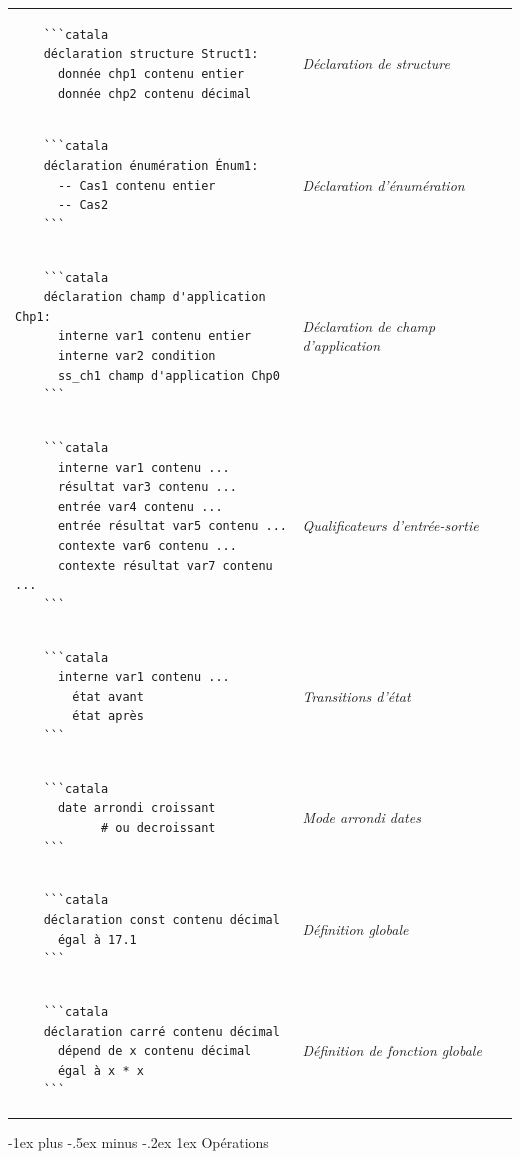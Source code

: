 \documentclass{article}
\makeatletter
\newcommand\articlenormalsize{\fontsize{10pt}{12pt}\selectfont}
\renewcommand{\section}{\@startsection{section}{1}{0mm}%
                                {-1ex plus -.5ex minus -.2ex}%
                                {1ex}%
                                {\normalfont\articlenormalsize\bfseries}}
\newenvironment{catala}{%
  \VerbatimEnvironment
  \let\FV@ListVSpace\relax
  \begin{verbatim}}%
 {\end{verbatim}}
\makeatother
\begin{document}
\begin{multicols}{3}
\begin{tabular}{@{}p{\cola}>{\slshape}p{\colb}@{}}
  
  \begin{catala}
    ```catala
    déclaration structure Struct1:
      donnée chp1 contenu entier
      donnée chp2 contenu décimal
  \end{catala}
  & Déclaration de structure
  \\
  \begin{catala}
    ```catala
    déclaration énumération Énum1:
      -- Cas1 contenu entier
      -- Cas2
    ```
  \end{catala}
  & Déclaration d'énumération
  \\
  \begin{catala}
    ```catala
    déclaration champ d'application Chp1:
      interne var1 contenu entier
      interne var2 condition
      ss_ch1 champ d'application Chp0
    ```
  \end{catala}
  & Déclaration de champ d'application
  \\
  \begin{catala}
    ```catala
      interne var1 contenu ...
      résultat var3 contenu ...
      entrée var4 contenu ...
      entrée résultat var5 contenu ...
      contexte var6 contenu ...
      contexte résultat var7 contenu ...
    ```
  \end{catala}
  & Qualificateurs d'entrée-sortie
  \\
  \begin{catala}
    ```catala
      interne var1 contenu ...
        état avant
        état après
    ```
  \end{catala}
  & Transitions d'état
  \\
  \begin{catala}
    ```catala
      date arrondi croissant
            # ou decroissant
    ```
  \end{catala}
  & Mode arrondi dates
  \\
  \begin{catala}
    ```catala
    déclaration const contenu décimal
      égal à 17.1
    ```
  \end{catala}
  & Définition globale
  \\
  \begin{catala}
    ```catala
    déclaration carré contenu décimal
      dépend de x contenu décimal
      égal à x * x
    ```
  \end{catala}
  & Définition de fonction globale
  \\
\end{tabular}

\section{Opérations}


\end{multicols}
\end{document}
